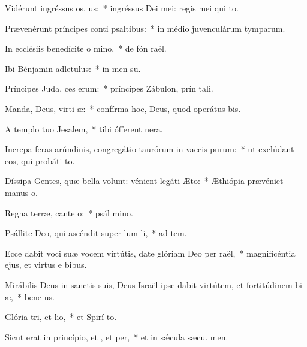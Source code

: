 \item Vidérunt ingréssus os, us:~* ingréssus Dei mei: regis mei qui   to.
\item Prævenérunt príncipes conti psaltibus:~* in médio juvenculárum tymparum.
\item In ecclésiis benedícite o mino,~* de fón raël.
\item Ibi Bénjamin adletulus:~* in men su.
\item Príncipes Juda, ces erum:~* príncipes Zábulon, prín tali.
\item Manda, Deus, virti æ:~* confírma hoc, Deus, quod operátus   bis.
\item A templo tuo  Jesalem,~* tibi ófferent  nera.
\item Increpa feras arúndinis, congregátio taurórum in vaccis purum:~* ut exclúdant eos, qui probáti  to.
\item Díssipa Gentes, quæ bella volunt: vénient legáti  Æto:~* Æthiópia prævéniet manus  o.
\item Regna terræ, cante o:~* psál mino.
\item Psállite Deo, qui ascéndit super lum li,~* ad tem.
\item Ecce dabit voci suæ vocem virtútis, date glóriam Deo per raël,~* magnificéntia ejus, et virtus e  bibus.
\item Mirábilis Deus in sanctis suis, Deus Israël ipse dabit virtútem, et fortitúdinem bi æ,~* bene us.
\item Glória tri, et lio,~* et Spirí to.
\item Sicut erat in princípio, et , et per,~* et in sǽcula sæcu. men.
